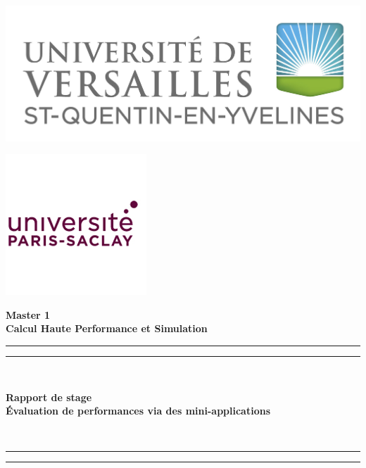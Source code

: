 \documentclass[11pt,a4paper,oneside]{memoir}
\theoremstyle{definition}
\theoremstyle{remark}
\theoremstyle{plain}
\begin{document}

\hypersetup{hidelinks}


\thispagestyle{empty}

\begin{minipage}{.47\textwidth}
\centering
\begin{flushleft}
\includegraphics[scale=0.25]{./Images-Rapport/logo_uvsq.jpeg}
\end{flushleft}
\end{minipage}
\begin{minipage}{.47\textwidth}
\centering
\begin{flushright}
\hspace*{1cm} \includegraphics[scale=0.9]{./Images-Rapport/logo_saclay.jpeg}
\end{flushright}
\end{minipage}


\begin{center}
\huge
\textbf{Master 1\\ Calcul Haute Performance et Simulation}
\end{center}


\begin{center}
  \hrule
  \hrule
  ~\\
  \begin{center}
    \huge
    \textbf{Rapport de stage}\\
    \bigskip
    \textbf{\'Evaluation de performances via des mini-applications}\\
  \end{center}
  ~\\
  \hrule
  \hrule
\end{center}
\end{document}
